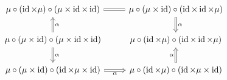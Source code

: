         \begin{equation*}
            \begin{tikzcd}
                \mu \circ (\id \times \mu) \circ (\mu \times \id \times \id) \arrow[r, equal]                                   & \mu \circ (\mu \times \id) \circ (\id \times \id \times \mu) \arrow[d, "\alpha", Rightarrow] \\
                \mu \circ (\mu \times \id) \circ (\mu \times \id \times \id) \arrow[u, "\alpha"', Rightarrow] \arrow[d, "\alpha", Rightarrow] & \mu \circ (\id \times \mu) \circ (\id \times \id \times \mu)                                 \\
                \mu \circ (\mu \times \id) \circ (\id \times \mu \times \id) \arrow[r, "\alpha"', Rightarrow]                                 & \mu \circ (\id \times \mu) \circ (\id \times \mu \times \id) \arrow[u, "\alpha", Rightarrow]
            \end{tikzcd}
        \end{equation*}
        \smallskip
        
